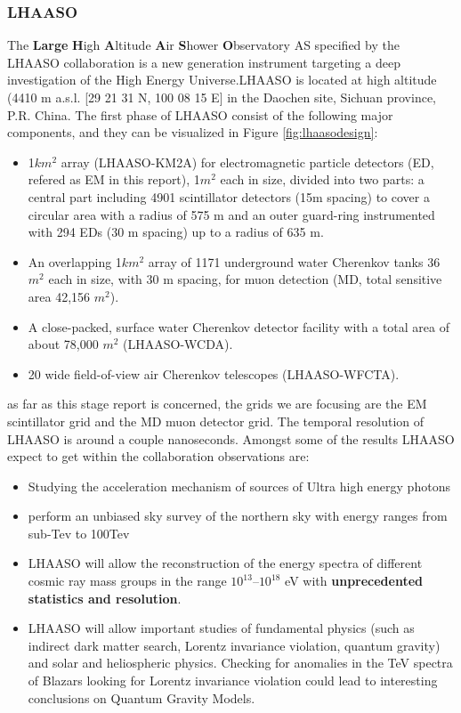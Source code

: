 \documentclass{article}
\begin{document}
\subsubsection{LHAASO}
The \textbf{Large} \textbf{H}igh \textbf{A}ltitude \textbf{A}ir \textbf{S}hower \textbf{O}bservatory
AS specified by the LHAASO collaboration\cite{LHAASOpaper}  is a new generation
instrument targeting a deep investigation of the High Energy Universe.LHAASO is located at high altitude (4410 m a.s.l. [29  21  31 N, 100 08 15 E]
in the Daochen site, Sichuan province, P.R. China.
The first phase of LHAASO consist of the following major components, and they can be visualized in Figure \ref{fig:lhaasodesign}:
\begin{itemize}
    \item 1$km^2$ array (LHAASO-KM2A) for electromagnetic particle detectors (ED, refered as EM in this report), 1$m^2$ each in size,
divided into two parts: a central part including 4901 scintillator detectors (15m spacing) to cover
a circular area with a radius of 575 m and an outer guard-ring instrumented with 294 EDs (30 m
spacing) up to a radius of 635 m.
 \item An overlapping 1$km^2$ array of 1171 underground water Cherenkov tanks 36$m^2$ each in size, with
30 m spacing, for muon detection (MD, total sensitive area 42,156 $m^2$).
 \item A close-packed, surface water Cherenkov detector facility with a total area of about 78,000 $m^2$
(LHAASO-WCDA).
 \item 20 wide field-of-view air Cherenkov telescopes (LHAASO-WFCTA).
\end{itemize}
as far as this stage report is concerned, the grids we are focusing are the EM scintillator grid and the MD muon detector grid. The temporal resolution of LHAASO is around a couple nanoseconds. Amongst some of the results LHAASO expect to get within the collaboration observations are:
\begin{itemize}
    \item Studying the acceleration mechanism of sources of Ultra high energy photons
    \item perform an unbiased sky survey of the northern sky with energy ranges from sub-Tev to 100Tev
    \item LHAASO will allow the reconstruction of the energy spectra of different cosmic ray mass groups
in the range $10^{13} – 10^{18}$ eV with \textbf{unprecedented statistics and resolution}.
\item LHAASO will allow important studies of fundamental physics
(such as indirect dark matter search, Lorentz invariance violation, quantum gravity) and solar and heliospheric
physics. Checking for anomalies in the TeV spectra of Blazars looking for Lorentz invariance violation could lead to interesting conclusions on Quantum Gravity Models.


\end{itemize}
\end{document}
